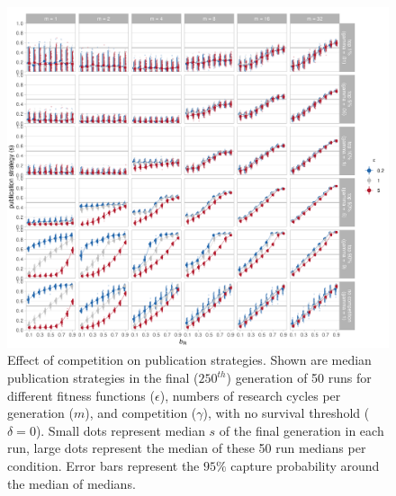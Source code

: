 \documentclass[
]{article}
\begin{document}
\begin{figure}[H]
\includegraphics[width=1.1\linewidth]{../plots/plot_gamma_line_evo} \caption{Effect of competition on publication strategies. Shown are median publication strategies in the final ($250^{th}$) generation of 50 runs for different fitness functions ($\epsilon$), numbers of research cycles per generation ($m$), and competition ($\gamma$), with no survival threshold ($\delta = 0$). Small dots represent median $s$ of the final generation in each run, large dots represent the median of these 50 run medians per condition. Error bars represent the $95\%$ capture probability around the median of medians.}\label{fig:A4-gammalineplot}
\end{figure}
\end{document}
